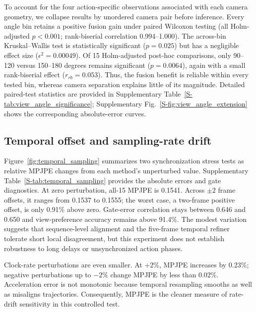 \documentclass[preprint,12pt]{elsarticle}
\providecommand{\DIFaddbegin}{} %
\providecommand{\DIFaddend}{} %
\providecommand{\DIFadd}[1]{{\protect\color{blue}#1}} %
\begin{document}

To account for the four action-specific observations associated with each camera geometry, we collapse results by unordered camera pair before inference. Every angle bin retains a positive fusion gain under paired Wilcoxon testing (all Holm-adjusted \(p<0.001\); rank-biserial correlation 0.994--1.000). The across-bin Kruskal--Wallis test is statistically significant (\(p=0.025\)) but has a negligible effect size (\(\epsilon^2=0.00049\)). Of 15 Holm-adjusted post-hoc comparisons, only 90--120 versus 150--180 degrees remains significant (\(p=0.0064\)), again with a small rank-biserial effect (\(r_{rb}=0.053\)). Thus, the fusion benefit is reliable within every tested bin, whereas camera separation explains little of its magnitude.  Detailed paired-test statistics are provided in Supplementary Table~\ref{S-tab:view_angle_significance}; Supplementary Fig.~\ref{S-fig:view_angle_extension} shows the corresponding absolute-error curves.

 \DIFaddbegin \FloatBarrier
\subsection{\DIFadd{Temporal offset and sampling-rate drift}}
\DIFaddend 

Figure~\ref{fig:temporal_sampling} summarizes two synchronization stress tests as relative MPJPE changes from each method's unperturbed value. Supplementary Table~\ref{S-tab:temporal_sampling} provides the absolute errors and gate diagnostics. At zero perturbation, all-15 MPJPE is 0.1541. Across \(\pm2\) frame offsets, it ranges from 0.1537 to 0.1555; the worst case, a two-frame positive offset, is only 0.91\% above zero. Gate-error correlation stays between 0.646 and 0.650 and view-preference accuracy remains above 91.4\%. The modest variation suggests that sequence-level alignment and the five-frame temporal refiner tolerate short local disagreement, but this experiment does not establish robustness to long delays or unsynchronized action phases.

Clock-rate perturbations are even smaller. At \(+2\%\), MPJPE increases by 0.23\%; negative perturbations up to \(-2\%\) change MPJPE by less than 0.02\%. Acceleration error is not monotonic because temporal resampling smooths as well as misaligns trajectories. Consequently, MPJPE is the cleaner measure of rate-drift sensitivity in this controlled test.
\end{document}
